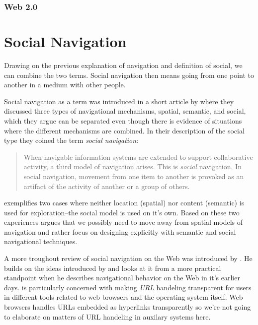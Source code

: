 \subsubsection{Web 2.0}

\section{Social Navigation}
\label{section:background.social.navigation}
Drawing on the previous explanation of navigation and definition of social, we
can combine the two terms. Social navigation then means going from one point
to another in a medium with other people.

Social navigation as a term was introduced in a short article by
\citet{dourish94} where they discussed three types of navigational mechanisms,
spatial, semantic, and social, which they argue can be separated even though
there is evidence of situations where the different mechanisms are combined.
In their description of the social type they coined the term
\emph{social navigation}:

\begin{quote}
  When navigable information systems are extended to support collaborative
  activity, a third model of navigation arises. This is \emph{social}
  navigation. In social navigation, movement from one item to another is
  provoked as an artifact of the activity of another or a group of others.
  \citep[p.~1]{dourish94}
\end{quote}

\citeauthor{dourish94} exemplifies two cases where neither location
(spatial) nor content (semantic) is used for exploration--the social model
is used on it's own. Based on these two experiences \citeauthor{dourish94}
argues that we possibly need to move away from spatial models of navigation
and rather focus on designing explicitly with semantic and social navigational
techniques.

A more troughout review of social navigation on the Web was introduced
by \citet{dieberger97}. He builds on the ideas introduced by
\citeauthor{dourish94} and looks at it from a more practical standpoint when
he describes navigational behavior on the Web in it's earlier days.
\citeauthor{dieberger97} is particularly concerned with making \emph{URL}%
handeling transparent for users in different tools related to web browsers and
the operating system itself. Web browsers handles URLs embedded as hyperlinks
transparently so we're not going to elaborate on matters of URL handeling in
auxilary systems here.

